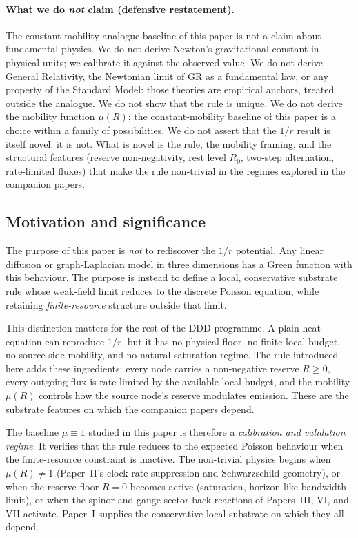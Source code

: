 \documentclass[11pt,a4paper]{article}
\begin{document}
\paragraph{What we do \emph{not} claim (defensive
restatement).} The constant-mobility analogue baseline of this
paper is not a claim about fundamental physics. We do not
derive Newton's gravitational constant in physical units; we
calibrate it against the observed value. We do not derive
General Relativity, the Newtonian limit of GR as a fundamental
law, or any property of the Standard Model: those theories are
empirical anchors, treated outside the analogue. We do not
show that the rule is unique.
We do not derive the mobility function $\mu(R)$; the
constant-mobility baseline of this paper is a choice within a
family of possibilities. We do not assert that the $1/r$
result is itself novel: it is not. What is novel is the rule,
the mobility framing, and the structural features (reserve
non-negativity, rest level $R_0$, two-step alternation,
rate-limited fluxes) that make the rule non-trivial in the
regimes explored in the companion papers.

\subsection*{Motivation and significance}

The purpose of this paper is \emph{not} to rediscover the
$1/r$ potential. Any linear diffusion or graph-Laplacian model
in three dimensions has a Green function with this behaviour.
The purpose is instead to define a local, conservative substrate
rule whose weak-field limit reduces to the discrete Poisson
equation, while retaining \emph{finite-resource} structure
outside that limit.

This distinction matters for the rest of the DDD programme. A
plain heat equation can reproduce $1/r$, but it has no physical
floor, no finite local budget, no source-side mobility, and no
natural saturation regime. The rule introduced here adds these
ingredients: every node carries a non-negative reserve $R \geq
0$, every outgoing flux is rate-limited by the available local
budget, and the mobility $\mu(R)$ controls how the source
node's reserve modulates emission. These are the substrate
features on which the companion papers depend.

The baseline $\mu \equiv 1$ studied in this paper is therefore
a \emph{calibration and validation regime}. It verifies that the
rule reduces to the expected Poisson behaviour when the
finite-resource constraint is inactive. The non-trivial physics
begins when $\mu(R) \neq 1$ (Paper~II's clock-rate suppression
and Schwarzschild geometry), or when the reserve floor $R = 0$
becomes active (saturation, horizon-like bandwidth limit), or
when the spinor and gauge-sector back-reactions of Papers~III,
VI, and VII activate. Paper~I supplies the conservative local
substrate on which they all depend.
\end{document}
